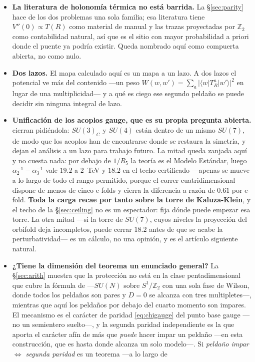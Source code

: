\documentclass[11pt,a4paper]{article}
\newcommand{\ZZ}{\mathbb{Z}}
\newcommand{\su}[1]{SU(#1)}
\begin{document}
\begin{itemize}
\item \textbf{La literatura de holonomía térmica no está barrida.} La \S\ref{sec:parity} hace de los
dos problemas una sola familia; esa literatura tiene $V''(0)\propto T(R)$ como material de manual y
las trazas proyectadas por $\ZZ_2$ como contabilidad natural, así que es el sitio con mayor
probabilidad a priori donde el puente ya podría existir. Queda nombrado aquí como compuerta abierta,
no como nulo.
\item \textbf{Dos lazos.} El mapa calculado aquí es un mapa a un lazo. A dos lazos el potencial ve
más del contenido ---un peso $W(w,w')=\sum_a|\langle w|T^a_R|w'\rangle|^2$ en lugar de una
multiplicidad--- y a qué es ciego ese segundo peldaño se puede decidir sin ninguna integral de lazo.
\item \textbf{Unificación de los acoplos gauge, que es su propia pregunta abierta.} \cite{KM25}
cierran pidiéndola: $\su3_C$ y $\su4$ están dentro de un mismo $\su7$, de modo que los acoplos han de
encontrarse donde se restaura la simetría, y dejan el análisis a un lazo para trabajo futuro. La
mitad queda zanjada aquí y no cuesta nada: por debajo de $1/R_5$ la teoría es el Modelo Estándar,
luego $\alpha_2^{-1}-\alpha_3^{-1}$ vale $19.2$ a $2$~TeV y $18.2$ en el techo certificado ---apenas
se mueve a lo largo de todo el rango permitido, porque el correr cuatridimensional dispone de menos
de cinco e-folds y cierra la diferencia a razón de $0.61$ por e-fold. \textbf{Toda la carga recae por
tanto sobre la torre de Kaluza-Klein}, y el techo de la \S\ref{sec:ceiling} no es un espectador: fija
dónde puede empezar esa torre. La otra mitad ---si la torre de $\su7$, cuyos niveles la proyección
del orbifold deja incompletos, puede cerrar $18.2$ antes de que se acabe la perturbatividad--- es un
cálculo, no una opinión, y es el artículo siguiente natural.
\item \textbf{¿Tiene la dimensión del teorema un enunciado general?} La \S\ref{sec:arith} muestra que
la protección no está en la clase pentadimensional que cubre la fórmula de \cite{HY04} ---$\su{N}$
sobre $S^1/\ZZ_2$ con una sola fase de Wilson, donde todos los peldaños son pares y $D=0$ se alcanza
con tres multipletes---, mientras que aquí los peldaños por debajo del cuarto momento son impares. El
mecanismo es el carácter de paridad \eqref{eq:chigauge} del punto base gauge ---no un semientero
suelto---, y la segunda paridad independiente es la que aporta el carácter afín de más que \emph{puede}
hacer impar un peldaño ---en esta construcción, que es hasta donde alcanza un solo modelo---. Si \emph{peldaño impar $\Leftrightarrow$ segunda paridad} es un teorema ---a lo largo de

\end{itemize}
\end{document}
